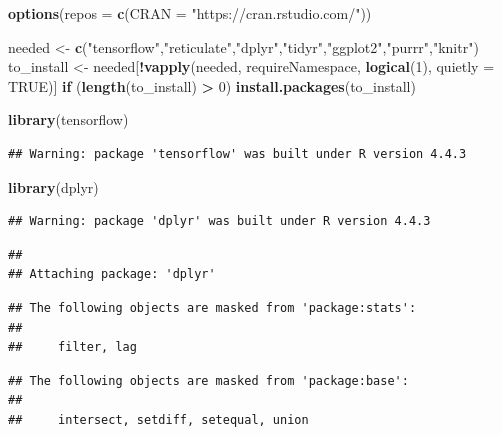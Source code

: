 \documentclass[
]{article}
\newenvironment{Shaded}{\begin{snugshade}}{\end{snugshade}}
\newcommand{\AttributeTok}[1]{\textcolor[rgb]{0.13,0.29,0.53}{#1}}
\newcommand{\ConstantTok}[1]{\textcolor[rgb]{0.56,0.35,0.01}{#1}}
\newcommand{\ControlFlowTok}[1]{\textcolor[rgb]{0.13,0.29,0.53}{\textbf{#1}}}
\newcommand{\DecValTok}[1]{\textcolor[rgb]{0.00,0.00,0.81}{#1}}
\newcommand{\FunctionTok}[1]{\textcolor[rgb]{0.13,0.29,0.53}{\textbf{#1}}}
\newcommand{\NormalTok}[1]{#1}
\newcommand{\OtherTok}[1]{\textcolor[rgb]{0.56,0.35,0.01}{#1}}
\newcommand{\SpecialCharTok}[1]{\textcolor[rgb]{0.81,0.36,0.00}{\textbf{#1}}}
\newcommand{\StringTok}[1]{\textcolor[rgb]{0.31,0.60,0.02}{#1}}
\begin{document}
\begin{Shaded}
\begin{Highlighting}[]
\FunctionTok{options}\NormalTok{(}\AttributeTok{repos =} \FunctionTok{c}\NormalTok{(}\AttributeTok{CRAN =} \StringTok{"https://cran.rstudio.com/"}\NormalTok{))}

\NormalTok{needed }\OtherTok{\textless{}{-}} \FunctionTok{c}\NormalTok{(}\StringTok{"tensorflow"}\NormalTok{,}\StringTok{"reticulate"}\NormalTok{,}\StringTok{"dplyr"}\NormalTok{,}\StringTok{"tidyr"}\NormalTok{,}\StringTok{"ggplot2"}\NormalTok{,}\StringTok{"purrr"}\NormalTok{,}\StringTok{"knitr"}\NormalTok{)}
\NormalTok{to\_install }\OtherTok{\textless{}{-}}\NormalTok{ needed[}\SpecialCharTok{!}\FunctionTok{vapply}\NormalTok{(needed, requireNamespace, }\FunctionTok{logical}\NormalTok{(}\DecValTok{1}\NormalTok{), }\AttributeTok{quietly =} \ConstantTok{TRUE}\NormalTok{)]}
\ControlFlowTok{if}\NormalTok{ (}\FunctionTok{length}\NormalTok{(to\_install) }\SpecialCharTok{\textgreater{}} \DecValTok{0}\NormalTok{) }\FunctionTok{install.packages}\NormalTok{(to\_install)}

\FunctionTok{library}\NormalTok{(tensorflow)}
\end{Highlighting}
\end{Shaded}

\begin{verbatim}
## Warning: package 'tensorflow' was built under R version 4.4.3
\end{verbatim}

\begin{Shaded}
\begin{Highlighting}[]
\FunctionTok{library}\NormalTok{(dplyr)}
\end{Highlighting}
\end{Shaded}

\begin{verbatim}
## Warning: package 'dplyr' was built under R version 4.4.3
\end{verbatim}

\begin{verbatim}
## 
## Attaching package: 'dplyr'
\end{verbatim}

\begin{verbatim}
## The following objects are masked from 'package:stats':
## 
##     filter, lag
\end{verbatim}

\begin{verbatim}
## The following objects are masked from 'package:base':
## 
##     intersect, setdiff, setequal, union
\end{verbatim}
\end{document}
